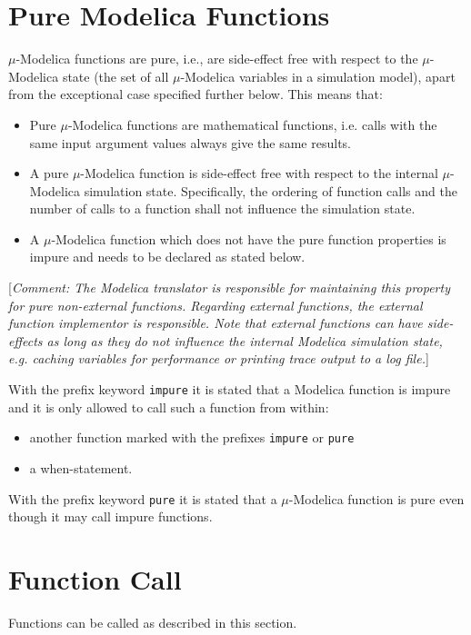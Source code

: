 \documentclass[11pt,a4paper,notitlepage]{report}
\begin{document}
\section{Pure Modelica Functions}
$\mu$-Modelica functions are pure, i.e., are side-effect free with respect to the $\mu$-Modelica state (the set of all $\mu$-Modelica variables in a simulation model), apart from the exceptional case specified further below. This means that:
\begin{itemize}
\item  Pure $\mu$-Modelica functions are mathematical functions, i.e. calls with the same input argument values always give the same results.
\item A pure $\mu$-Modelica function is side-effect free with respect to the internal $\mu$-Modelica simulation state. Specifically, the ordering of function calls and the number of calls to a function shall not influence the simulation state.
\item A $\mu$-Modelica function which does not have the pure function properties is impure and needs to be declared as stated below. 
\end{itemize}

[\emph{Comment: The Modelica translator is responsible for maintaining this property for pure non-external
functions. Regarding external functions, the external function implementor is responsible. Note that external functions can have side-effects as long as they do not influence the internal Modelica simulation state, e.g. caching variables for performance or printing trace output to a log file.}]

With the prefix keyword \verb"impure" it is stated that a Modelica function is impure and it is only allowed to call such a function from within:
\begin{itemize}
\item another function marked with the prefixes \verb"impure" or \verb"pure"
\item a when-statement.  
\end{itemize}

With the prefix keyword \verb"pure" it is stated that a $\mu$-Modelica function is pure even though it may call impure functions.

\section{Function Call}
Functions can be called as described in this section.
\end{document}
